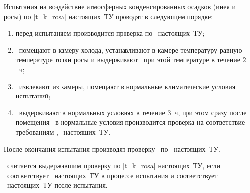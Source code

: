 Испытания на воздействие атмосферных конденсированных осадков (инея и росы) по \ref{t_k_rosa} настоящих~ТУ проводят в следующем порядке:
%
\begin{enumerate}
	\item перед испытанием производится проверка по \treb \ настоящих~ТУ;
	\item \dut \ помещают в камеру холода, устанавливают в камере температуру равную температуре точки росы и выдерживают \dut \ при этой температуре в течение $2$~ч;
	\item \dut \ извлекают из камеры, помещают в нормальные климатические условия испытаний; 
	\item \dut \ выдерживают в нормальных условиях в течение $3$~ч, при этом сразу после помещения \dut \ в нормальные условия производится проверка на соответствие требованиям \treb, \trebafter \ настоящих~ТУ.
\end{enumerate}


После окончания испытания производят проверку \dut \ по \trebafter \ настоящих~ТУ.

\dut \ считается выдержавшим проверку по \ref{t_k_rosa} настоящих~ТУ, если \dut \ соответствует \treb \ настоящих~ТУ в процессе испытания и соответствует \trebafter \ настоящих~ТУ после испытания.